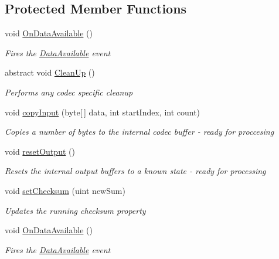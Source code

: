 \subsection*{Protected Member Functions}
\begin{DoxyCompactItemize}
\item 
void \hyperlink{class_dot_z_lib_1_1_codec_base_a5c697195bc017ae951858e7c8948f9ae}{On\+Data\+Available} ()
\begin{DoxyCompactList}\small\item\em Fires the \hyperlink{class_dot_z_lib_1_1_codec_base_ad7ec5a193ad07d7c91d2538c51eb33c1}{Data\+Available} event \end{DoxyCompactList}\item 
abstract void \hyperlink{class_dot_z_lib_1_1_codec_base_aa0ded075105c5cf6f5f0d61928c90ca6}{Clean\+Up} ()
\begin{DoxyCompactList}\small\item\em Performs any codec specific cleanup \end{DoxyCompactList}\item 
void \hyperlink{class_dot_z_lib_1_1_codec_base_a8c827f091195356490e7f8b69e0546a7}{copy\+Input} (byte\mbox{[}$\,$\mbox{]} data, int start\+Index, int count)
\begin{DoxyCompactList}\small\item\em Copies a number of bytes to the internal codec buffer -\/ ready for proccesing \end{DoxyCompactList}\item 
void \hyperlink{class_dot_z_lib_1_1_codec_base_a801b625073b21aeaab52ebf9e96dd9c9}{reset\+Output} ()
\begin{DoxyCompactList}\small\item\em Resets the internal output buffers to a known state -\/ ready for processing \end{DoxyCompactList}\item 
void \hyperlink{class_dot_z_lib_1_1_codec_base_a5dfa2dddf3ac857652af7fd8e3d2034d}{set\+Checksum} (uint new\+Sum)
\begin{DoxyCompactList}\small\item\em Updates the running checksum property \end{DoxyCompactList}\item 
void \hyperlink{class_dot_z_lib_1_1_codec_base_a5c697195bc017ae951858e7c8948f9ae}{On\+Data\+Available} ()
\begin{DoxyCompactList}\small\item\em Fires the \hyperlink{class_dot_z_lib_1_1_codec_base_ad7ec5a193ad07d7c91d2538c51eb33c1}{Data\+Available} event \end{DoxyCompactList}\item 

\end{DoxyCompactItemize}

